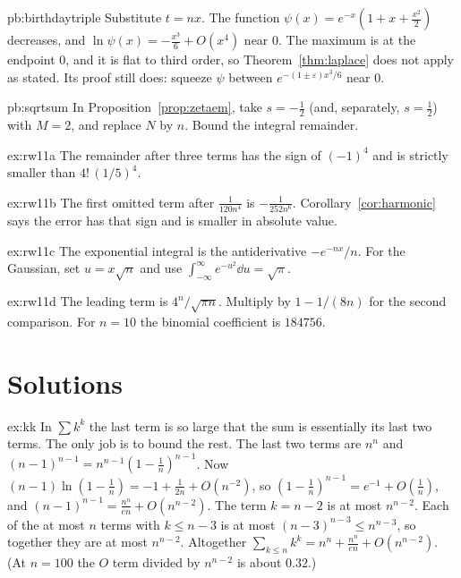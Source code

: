 \begin{hint}{pb:birthdaytriple}
Substitute $t=nx$. The function $\psi(x)=e^{-x}(1+x+\frac{x^2}2)$ decreases, and $\ln\psi(x)=-\frac{x^3}6+O(x^4)$ near $0$. The maximum is at the endpoint $0$, and it is flat to third order, so Theorem~\ref{thm:laplace} does not apply as stated. Its proof still does: squeeze $\psi$ between $e^{-(1\pm\varepsilon)x^3/6}$ near $0$.
\end{hint}

\begin{hint}{pb:sqrtsum}
In Proposition~\ref{prop:zetaem}, take $s=-\frac12$ (and, separately, $s=\frac12$) with $M=2$, and replace $N$ by $n$. Bound the integral remainder.
\end{hint}


\begin{hint}{ex:rw11a}
The remainder after three terms has the sign of $(-1)^4$ and is strictly smaller than $4!\,(1/5)^4$.
\end{hint}

\begin{hint}{ex:rw11b}
The first omitted term after $\frac1{120n^4}$ is $-\frac1{252n^6}$. Corollary~\ref{cor:harmonic} says the error has that sign and is smaller in absolute value.
\end{hint}

\begin{hint}{ex:rw11c}
The exponential integral is the antiderivative $-e^{-nx}/n$. For the Gaussian, set $u=x\sqrt n$ and use $\int_{-\infty}^\infty e^{-u^2}\dd u=\sqrt\pi$.
\end{hint}

\begin{hint}{ex:rw11d}
The leading term is $4^n/\sqrt{\pi n}$. Multiply by $1-1/(8n)$ for the second comparison. For $n=10$ the binomial coefficient is $184756$.
\end{hint}

\section{Solutions}

\begin{solution}{ex:kk}
\idea In $\sum k^k$ the last term is so large that the sum is essentially its last two terms. The only job is to bound the rest.
\writeup The last two terms are $n^n$ and $(n-1)^{n-1}=n^{n-1}(1-\frac1n)^{n-1}$. Now $(n-1)\ln(1-\frac1n)=-1+\frac1{2n}+O(n^{-2})$, so $(1-\frac1n)^{n-1}=e^{-1}+O(\frac1n)$, and $(n-1)^{n-1}=\frac{n^n}{en}+O(n^{n-2})$. The term $k=n-2$ is at most $n^{n-2}$. Each of the at most $n$ terms with $k\le n-3$ is at most $(n-3)^{n-3}\le n^{n-3}$, so together they are at most $n^{n-2}$. Altogether $\sum_{k\le n}k^k=n^n+\frac{n^n}{en}+O(n^{n-2})$. (At $n=100$ the $O$ term divided by $n^{n-2}$ is about $0.32$.)
\end{solution}


